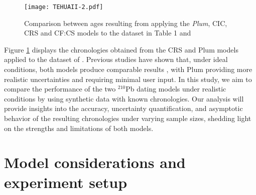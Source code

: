 \documentclass [10pt] {article}
\newcommand{\ac}{\color{red} }  %
\newcommand{\ca}{\color{black}} %
\begin{document}
\begin{figure}[h!]
 \centering
	\texttt{[image: TEHUAII-2.pdf]}
	\caption{Comparison between ages resulting from applying the \textit{Plum}, CIC, CRS and CF:CS models to the dataset in Table 1 and \citet{Sanchez-Cabeza2012}} 
  \label{fig:tehuaii}
\end{figure}



Figure \ref{fig:tehuaii} displays the chronologies obtained from the CRS and Plum models applied to the dataset of \citet{Sanchez-Cabeza2012}. Previous studies have shown that, under ideal conditions, both models produce comparable results \citep{Aquino2020}, with Plum providing more realistic uncertainties and requiring minimal user input. In this study, we aim to compare the performance of the two $^{210}$Pb dating models under realistic conditions by using synthetic data with known chronologies. Our analysis will provide insights into the accuracy, uncertainty quantification, and asymptotic behavior of the resulting chronologies under varying sample sizes, shedding light on the strengths and limitations of both models.


\section{Model considerations and experiment setup}\label{sec:exp_setup}
\end{document}
